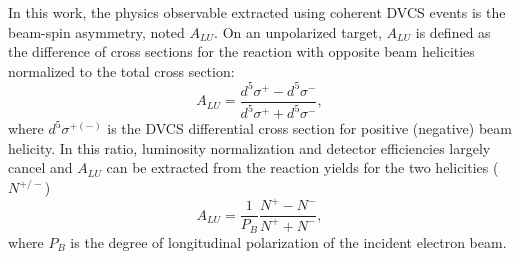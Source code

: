 \documentclass[twocolumn,nofootinbib,showpacs,prl,superscriptaddress,secnumarabic,amssymb,nobibnotes,aps,floatfix]{revtex4}
\begin{document}
In this work, the physics observable extracted using coherent DVCS events is
the beam-spin asymmetry, noted $A_{LU}$. On an unpolarized target, $A_{LU}$ is 
defined as the difference of cross sections for the reaction with opposite beam 
helicities normalized to the total cross section:
  \begin{equation}
  A_{LU} = \frac{d^{5}\sigma^{+} - d^{5}\sigma^{-} }
                {d^{5}\sigma^{+} + d^{5}\sigma^{-}},
    \label{BSA_equation}
  \end{equation}
where $d^{5}\sigma^{+(-)}$ is the DVCS differential cross 
section for positive (negative) beam helicity. 
In this ratio, luminosity normalization and
detector efficiencies largely cancel and $A_{LU}$ can be 
extracted from the reaction yields for the two helicities ($N^{+/-}$)
\begin{equation}
A_{LU} = \frac{1}{P_{B}} \frac{N^{+} - N^{-}}{N^{+} + N^{-} },
\end{equation}
where $P_{B}$ is the degree of longitudinal polarization of the incident electron beam.
\end{document}
